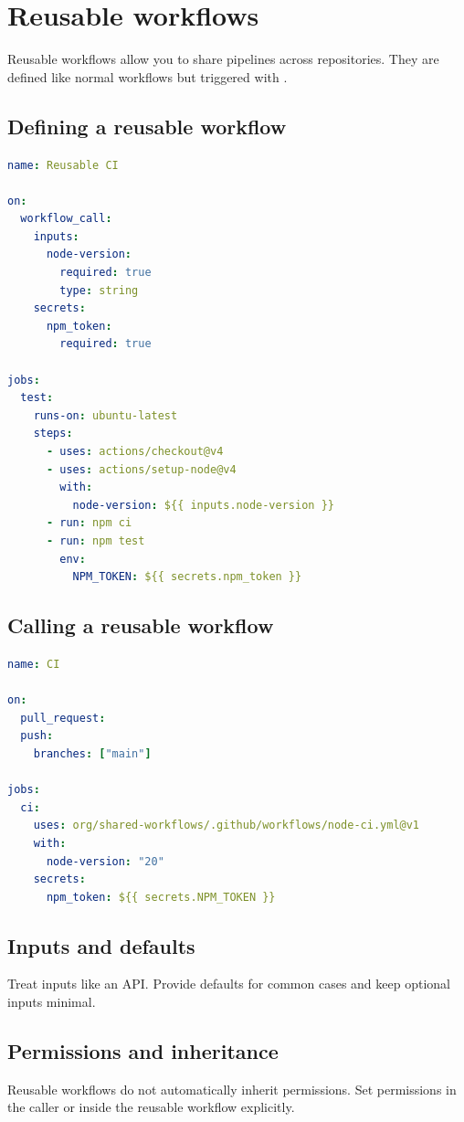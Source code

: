\chapter{Reusable workflows}

Reusable workflows allow you to share pipelines across repositories.
They are defined like normal workflows but triggered with .

\section{Defining a reusable workflow}
\begin{lstlisting}[language=YAML]
name: Reusable CI

on:
  workflow_call:
    inputs:
      node-version:
        required: true
        type: string
    secrets:
      npm_token:
        required: true

jobs:
  test:
    runs-on: ubuntu-latest
    steps:
      - uses: actions/checkout@v4
      - uses: actions/setup-node@v4
        with:
          node-version: ${{ inputs.node-version }}
      - run: npm ci
      - run: npm test
        env:
          NPM_TOKEN: ${{ secrets.npm_token }}
\end{lstlisting}

\section{Calling a reusable workflow}
\begin{lstlisting}[language=YAML]
name: CI

on:
  pull_request:
  push:
    branches: ["main"]

jobs:
  ci:
    uses: org/shared-workflows/.github/workflows/node-ci.yml@v1
    with:
      node-version: "20"
    secrets:
      npm_token: ${{ secrets.NPM_TOKEN }}
\end{lstlisting}

\section{Inputs and defaults}
Treat inputs like an API.
Provide defaults for common cases and keep optional inputs minimal.

\section{Permissions and inheritance}
Reusable workflows do not automatically inherit permissions.
Set permissions in the caller or inside the reusable workflow explicitly.

